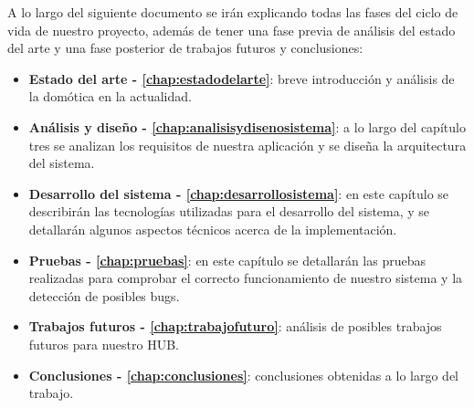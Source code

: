 
A lo largo del siguiente documento se irán explicando todas las fases del ciclo de vida de nuestro proyecto, además de tener una fase previa de análisis del estado del 
arte y una fase posterior de trabajos futuros y conclusiones:
\begin{itemize}
\item\textbf{Estado del arte - \autoref{chap:estadodelarte}}: breve introducción y análisis de la domótica en la actualidad.
\item\textbf{Análisis y diseño - \autoref{chap:analisisydisenosistema}}: a lo largo del capítulo tres se analizan los requisitos de nuestra aplicación y se diseña la arquitectura del sistema.
\item\textbf{Desarrollo del sistema - \autoref{chap:desarrollosistema}}: en este capítulo se describirán las tecnologías utilizadas para el desarrollo del sistema, y se detallarán 
algunos aspectos técnicos acerca de la implementación.
\item\textbf{Pruebas - \autoref{chap:pruebas}}: en este capítulo se detallarán las pruebas realizadas para comprobar el correcto funcionamiento
de nuestro sistema y la detección de posibles bugs.
\item\textbf{Trabajos futuros - \autoref{chap:trabajofuturo}}: análisis de posibles trabajos futuros para nuestro HUB.
\item\textbf{Conclusiones - \autoref{chap:conclusiones}}: conclusiones obtenidas a lo largo del trabajo.
\end{itemize}


\newpage \thispagestyle{empty} %